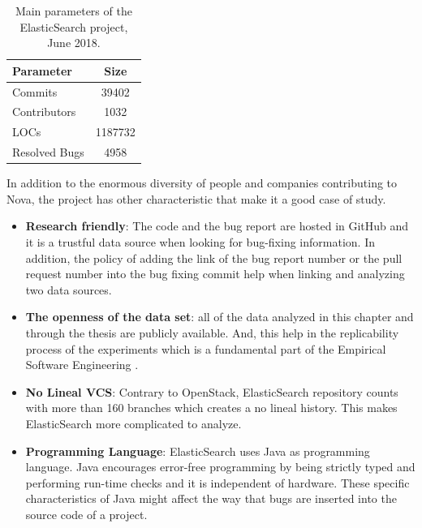 \documentclass[a4paper, 12pt]{book}
\begin{document}
 \begin{table}[!t]
\renewcommand{\arraystretch}{0.8}
\caption{Main parameters of the ElasticSearch project, June 2018.}
\label{tableES}
\centering

\begin{tabular}{|l|c|}
\hline
Parameter & Size \\
\hline
\hline
Commits & 39402 \\
\hline
Contributors & 1032 \\
\hline
LOCs & 1187732\\
\hline
Resolved Bugs & 4958\\
\hline
\end{tabular}
\end{table}

In addition to the enormous diversity of people and companies contributing to Nova, the project has other characteristic that make it a good case of study.
\begin{itemize}
	\item \textbf{Research friendly}: The code and the bug report are hosted in GitHub and it is a trustful data source when looking for bug-fixing information. In addition, the policy of adding the link of the bug report number or the pull request number into the bug fixing commit help when linking and analyzing two data sources.
	\item \textbf{The openness of the data set}: all of the data analyzed in this chapter and through the thesis are publicly available. And, this help in the replicability process of the experiments which is a fundamental part of the Empirical Software Engineering .
	\item \textbf{No Lineal VCS}: Contrary to OpenStack, ElasticSearch repository counts with more than 160 branches which creates a no lineal history. This makes ElasticSearch more complicated to analyze.
	\item \textbf{Programming Language}: ElasticSearch uses Java as programming language. Java encourages error-free programming by being strictly typed and performing run-time checks and it is independent of hardware. These specific characteristics of Java might affect the way that bugs are inserted into the source code of a project.
	\end{itemize}
\end{document}

